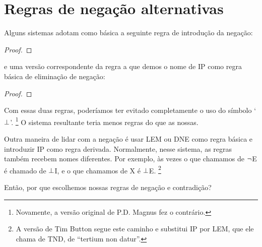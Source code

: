 \section{Regras de negação alternativas}
Alguns sistemas adotam como básica a seguinte regra de introdução da negação: 
\begin{proof}
	\open
	\close
\end{proof}
e uma versão correspondente da regra a que demos o nome de IP como regra básica de eliminação de negação: 
\begin{proof}
	\open
	\close
\end{proof}
Com essas duas regras, poderíamos ter evitado completamente o uso do símbolo `$\bot$'. \footnote{Novamente, a versão original de P.D. Magnus fez o contrário.} O sistema resultante teria menos regras do que as nossas.

Outra maneira de lidar com a negação é usar LEM ou DNE como regra básica e introduzir IP como regra derivada. Normalmente, nesse sistema, as regras também recebem nomes diferentes. Por exemplo, às vezes o que chamamos de $\neg$E é chamado de $\bot$I, e o que chamamos de X é $\bot$E. \footnote{A versão de Tim Button segue este caminho e substitui IP por LEM, que ele chama de TND, de ``tertium non datur''.} 

Então, por que escolhemos nossas regras de negação e contradição?

